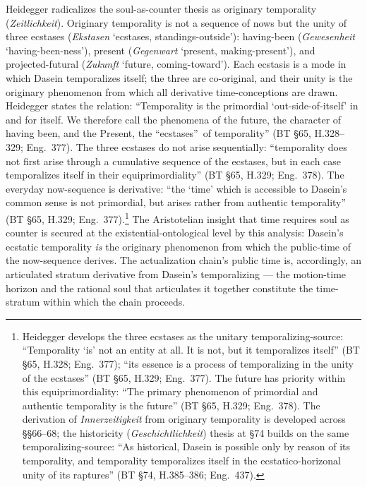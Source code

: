\documentclass{article}
\begin{document}
Heidegger radicalizes the soul-as-counter thesis as originary temporality (\textit{Zeitlichkeit}). Originary temporality is not a sequence of nows but the unity of three ecstases (\textit{Ekstasen} `ecstases, standings-outside'): having-been (\textit{Gewesenheit} `having-been-ness'), present (\textit{Gegenwart} `present, making-present'), and projected-futural (\textit{Zukunft} `future, coming-toward'). Each ecstasis is a mode in which Dasein temporalizes itself; the three are co-original, and their unity is the originary phenomenon from which all derivative time-conceptions are drawn. Heidegger states the relation: ``Temporality is the primordial `out-side-of-itself' in and for itself. We therefore call the phenomena of the future, the character of having been, and the Present, the \textquotedblleft ecstases\textquotedblright\ of temporality'' (BT \S 65, H.328--329; Eng.~377). The three ecstases do not arise sequentially: ``temporality does not first arise through a cumulative sequence of the ecstases, but in each case temporalizes itself in their equiprimordiality'' (BT \S 65, H.329; Eng.~378). The everyday now-sequence is derivative: ``the `time' which is accessible to Dasein's common sense is not primordial, but arises rather from authentic temporality'' (BT \S 65, H.329; Eng.~377).\footnote{Heidegger develops the three ecstases as the unitary temporalizing-source: ``Temporality `is' not an entity at all. It is not, but it temporalizes itself'' (BT §65, H.328; Eng.~377); ``its essence is a process of temporalizing in the unity of the ecstases'' (BT §65, H.329; Eng.~377). The future has priority within this equiprimordiality: ``The primary phenomenon of primordial and authentic temporality is the future'' (BT §65, H.329; Eng.~378). The derivation of \textit{Innerzeitigkeit} from originary temporality is developed across §§66--68; the historicity (\textit{Geschichtlichkeit}) thesis at §74 builds on the same temporalizing-source: ``As historical, Dasein is possible only by reason of its temporality, and temporality temporalizes itself in the ecstatico-horizonal unity of its raptures'' (BT §74, H.385--386; Eng.~437).} The Aristotelian insight that time requires soul as counter is secured at the existential-ontological level by this analysis: Dasein's ecstatic temporality \textit{is} the originary phenomenon from which the public-time of the now-sequence derives. The actualization chain's public time is, accordingly, an articulated stratum derivative from Dasein's temporalizing --- the motion-time horizon and the rational soul that articulates it together constitute the time-stratum within which the chain proceeds.
\end{document}
